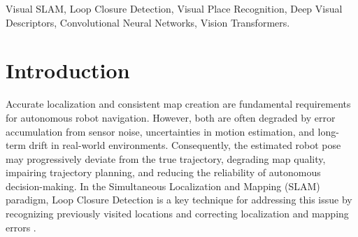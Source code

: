 \documentclass{ieeeaccess}
\begin{document}
\begin{abstract}
Loop Closure Detection is a fundamental component of Visual Simultaneous Localization and Mapping (SLAM), as it enables the recognition of previously visited locations and mitigates localization drift and map inconsistencies. However, robust Loop Closure Detection remains challenging under viewpoint changes, illumination variations, opposite traversal directions, and camera rotations. This paper presents a systematic and reproducible framework for evaluating deep visual descriptors under diverse operational conditions. Using the KITTI and TUM datasets, multiple Deep Neural Networks (DNNs) architectures are comparatively analyzed, including AlexNet, ConvNeXt, ResNet, Original VGG-16, Adapted and Fine-Tuned VGG-16, and Vision Transformer (ViT). The proposed framework investigates descriptor extraction and image-matching strategies for Visual SLAM place recognition. Performance is assessed using Accuracy, F1-score, Receiver Operating Characteristic (ROC) curves, and Area Under the Curve (AUC). Experimental results show that descriptor performance is highly dependent on viewpoint variation, traversal direction, and camera rotation. The Adapted and Fine-Tuned VGG-16 achieved the best results under relatively stable viewpoint conditions, whereas ResNet demonstrated comparatively stronger robustness in the evaluated opposite-traversal scenario. These findings highlight the strong influence of representation-learning strategies and operational conditions on Loop Closure Detection performance.
\end{abstract}

\begin{keywords}
Visual SLAM, Loop Closure Detection, Visual Place Recognition, Deep Visual Descriptors, Convolutional Neural Networks, Vision Transformers.
\end{keywords}

\titlepgskip=-21pt

\maketitle

\section{Introduction} 

Accurate localization and consistent map creation are fundamental requirements for autonomous robot navigation. However, both are often degraded by error accumulation from sensor noise, uncertainties in motion estimation, and long-term drift in real-world environments. Consequently, the estimated robot pose may progressively deviate from the true trajectory, degrading map quality, impairing trajectory planning, and reducing the reliability of autonomous decision-making. In the Simultaneous Localization and Mapping (SLAM) paradigm, Loop Closure Detection is a key technique for addressing this issue by recognizing previously visited locations and correcting localization and mapping errors \cite{Cadena2016SLAM,DurrantWhyte2006SLAMPartI,Thrun2008SLAM,Chen2020SurveyDeepLearningLocalizationMapping}.
\end{document}
